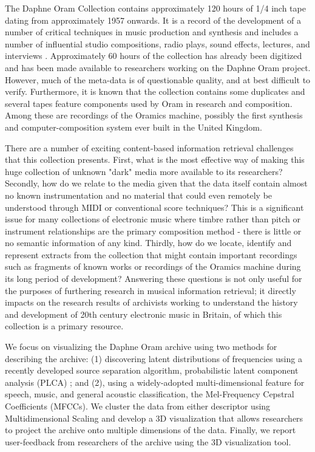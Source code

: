 The Daphne Oram Collection contains approximately 120 hours of 1/4 inch tape dating from approximately 1957 onwards. It is a record of the development of a number of critical techniques in music production and synthesis and includes a number of influential studio compositions, radio plays, sound effects, lectures, and interviews \cite{Young2008}.  Approximately 60 hours of the collection  has already been digitized and has been made available to researchers working on the Daphne Oram project.  However, much of the meta-data is of questionable quality, and at best difficult to verify. Furthermore, it is known that the collection contains some duplicates and several tapes feature components used by Oram in research and composition.  Among these are recordings of the Oramics machine, possibly the first synthesis and computer-composition system ever built in the United Kingdom.

There are a number of exciting content-based information retrieval challenges that this collection presents. First, what is the most effective way of making this huge collection of unknown "dark" media more available to its researchers? Secondly, how do we relate to the media given that the data itself contain almost no known instrumentation and no material that could even remotely be understood through MIDI or conventional score techniques? This is a significant issue for many collections of electronic music where timbre rather than pitch or instrument relationships are the primary composition method - there is little or no semantic information of any kind.  Thirdly, how do we locate, identify and represent extracts from the collection that might contain important recordings such as fragments of known works or recordings of the Oramics machine during its long period of development? Answering these questions is not only useful for the purposes of furthering research in musical information retrieval; it directly impacts on the research results of archivists working to understand the history and development of 20th century electronic music in Britain, of which this collection is a primary resource.

We focus on visualizing the Daphne Oram archive using two methods for describing the archive: (1) discovering latent distributions of frequencies using a recently developed source separation algorithm, probabilistic latent component analysis (PLCA) \cite{SmaragdisRajShashanka}; and (2), using a widely-adopted multi-dimensional feature for speech, music, and general acoustic classification, the Mel-Frequency Cepstral Coefficients (MFCCs).  We cluster the data from either descriptor using Multidimensional Scaling and develop a 3D visualization that allows researchers to project the archive onto multiple dimensions of the data.  Finally, we report user-feedback from researchers of the archive using the 3D visualization tool.  

